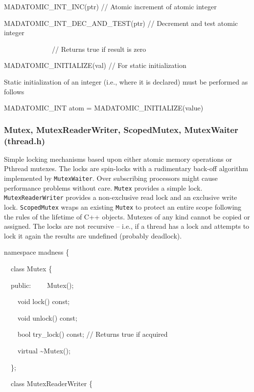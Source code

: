\documentclass[letterpaper]{article}
\begin{document}
{\ttfamily
MADATOMIC\_INT\_INC(ptr) // Atomic increment of atomic integer}

{\ttfamily
MADATOMIC\_INT\_DEC\_AND\_TEST(ptr) // Decrement and test atomic integer}

{\ttfamily
\ \ \ \ \ \ \ \ \ \ \ \  \ \ // Returns true if result is zero}

{\ttfamily
MADATOMIC\_INITIALIZE(val) // For static initialization}


\bigskip

Static initialization of an integer (i.e., where it is declared) must be performed as follows

{\ttfamily
MADATOMIC\_INT atom = MADATOMIC\_INITIALIZE(value)}


\bigskip

\subsubsection{Mutex, MutexReaderWriter, ScopedMutex, MutexWaiter (thread.h)}
Simple locking mechanisms based upon either atomic memory operations or Pthread mutexes. The locks are spin-locks with a
rudimentary back-off algorithm implemented by \texttt{MutexWaiter}. Over subscribing processors might cause performance
problems without care. \texttt{Mutex} provides a simple lock. \texttt{MutexReaderWriter} provides a non-exclusive read
lock and an exclusive write lock. \texttt{ScopedMutex} wraps an existing \texttt{Mutex} to protect an entire scope
following the rules of the lifetime of C++ objects. Mutexes of any kind cannot be copied or assigned. The locks are not
recursive -- i.e., if a thread has a lock and attempts to lock it again the results are undefined (probably deadlock).

{\ttfamily
namespace madness \{}

{\ttfamily
\ \ class Mutex \{}

{\ttfamily
\ \ public:\newline
\ \ \ \ Mutex();}

{\ttfamily
\ \ \ \ void lock() const;}

{\ttfamily
\ \ \ \ void unlock() const;}

{\ttfamily
\ \ \ \ bool try\_lock() const; // Returns true if acquired}

{\ttfamily
\ \ \ \ virtual \~{}Mutex();}

{\ttfamily
\ \ \};}


\bigskip

{\ttfamily
\ \ class MutexReaderWriter \{}
\end{document}
